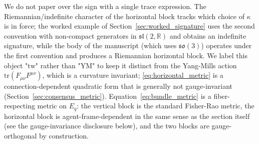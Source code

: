 \documentclass[11pt]{article}
\begin{document}
We do not paper over the sign with a single trace expression. The Riemannian/indefinite character of the horizontal block tracks which choice of $\kappa$ is in force; the worked example of Section~\ref{sec:worked_signature} uses the second convention with non-compact generators in $\mathfrak{sl}(2,\mathbb{R})$ and obtains an indefinite signature, while the body of the manuscript (which uses $\mathfrak{so}(3)$) operates under the first convention and produces a Riemannian horizontal block. We label this object "$\mathrm{tw}$" rather than "$\mathrm{YM}$" to keep it distinct from the Yang-Mills action $\mathrm{tr}(F_{\mu\nu}F^{\mu\nu})$, which is a curvature invariant; \eqref{eq:horizontal_metric} is a connection-dependent quadratic form that is generally not gauge-invariant (Section~\ref{sec:consensus_metric}). Equation~\eqref{eq:bundle_metric} is a fiber-respecting metric on $E_q$: the vertical block is the standard Fisher-Rao metric, the horizontal block is agent-frame-dependent in the same sense as the section itself (see the gauge-invariance disclosure below), and the two blocks are gauge-orthogonal by construction.
\end{document}
